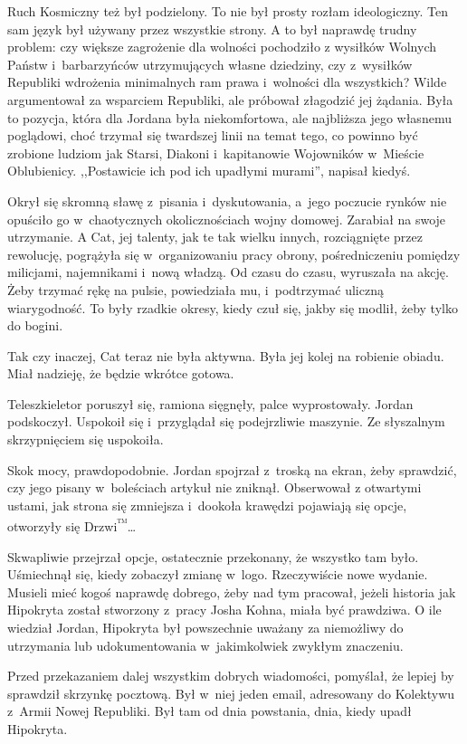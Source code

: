 \documentclass[oneside,polish,11pt,sfheadings]{mwbk}
\begin{document}
Ruch Kosmiczny też był podzielony. To nie był prosty rozłam
ideologiczny. Ten sam język był używany przez wszystkie strony. A to był
naprawdę trudny problem: czy większe zagrożenie dla wolności pochodziło
z wysiłków Wolnych Państw i~barbarzyńców utrzymujących własne dziedziny,
czy z~wysiłków Republiki wdrożenia minimalnych ram prawa i~wolności dla
wszystkich? Wilde argumentował za wsparciem Republiki, ale próbował
złagodzić jej żądania. Była to pozycja, która dla Jordana była
niekomfortowa, ale najbliższa jego własnemu poglądowi, choć trzymał się
twardszej linii na temat tego, co powinno być zrobione ludziom jak
Starsi, Diakoni i~kapitanowie Wojowników w~Mieście Oblubienicy. ,,Postawicie ich pod ich upadłymi murami'', napisał kiedyś.

Okrył się skromną sławę z~pisania i~dyskutowania, a~jego poczucie rynków
nie opuściło go w~chaotycznych okolicznościach wojny domowej. Zarabiał
na swoje utrzymanie. A Cat, jej talenty, jak te tak wielku innych,
rozciągnięte przez rewolucję, pogrążyła się w~organizowaniu pracy
obrony, pośredniczeniu pomiędzy milicjami, najemnikami i~nową władzą. Od
czasu do czasu, wyruszała na akcję. Żeby trzymać rękę na pulsie,
powiedziała mu, i~podtrzymać uliczną wiarygodność. To były rzadkie
okresy, kiedy czuł się, jakby się modlił, żeby tylko do bogini.

Tak czy inaczej, Cat teraz nie była aktywna. Była jej kolej na robienie
obiadu. Miał nadzieję, że będzie wkrótce gotowa.
  
Teleszkieletor poruszył się, ramiona sięgnęły, palce wyprostowały.
Jordan podskoczył. Uspokoił się i~przyglądał się podejrzliwie maszynie.
Ze słyszalnym skrzypnięciem się uspokoiła.

Skok mocy, prawdopodobnie. Jordan spojrzał z~troską na ekran, żeby
sprawdzić, czy jego pisany w~boleściach artykuł nie zniknął. Obserwował
z otwartymi ustami, jak strona się zmniejsza i~dookoła krawędzi
pojawiają się opcje, otworzyły się Drzwi\textsuperscript{™}\ldots

Skwapliwie przejrzał opcje, ostatecznie przekonany, że wszystko tam
było. Uśmiechnął się, kiedy zobaczył zmianę w~logo. Rzeczywiście nowe
wydanie. Musieli mieć kogoś naprawdę dobrego, żeby nad tym pracował,
jeżeli historia jak Hipokryta został stworzony z~pracy Josha Kohna,
miała być prawdziwa. O ile wiedział Jordan, Hipokryta był powszechnie
uważany za niemożliwy do utrzymania lub udokumentowania w~jakimkolwiek
zwykłym znaczeniu.

Przed przekazaniem dalej wszystkim dobrych wiadomości, pomyślał, że
lepiej by sprawdził skrzynkę pocztową. Był w~niej jeden email,
adresowany do Kolektywu z~Armii Nowej Republiki. Był tam od dnia
powstania, dnia, kiedy upadł Hipokryta.
\end{document}
